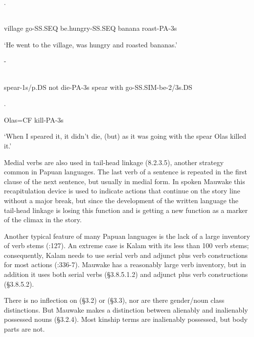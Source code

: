 \ea%
\label{ex:x662}
\gll {}. \\
      \\
\glt
\z

village  go-SS.SEQ  be.hungry-SS.SEQ  banana  roast-PA-3s  

`He went to the village, was hungry and roasted bananas.'

\ea%
\label{ex:x663}
\gll {}- \\
      \\
\glt
\z

spear-1s/p.DS  not  die-PA-3s  spear  with  go-SS.SIM-be-2/3s.DS  

.

Olas=CF  kill-PA-3s

`When I speared it, it didn't die, (but) as it was going with the spear Olas killed it.'

Medial verbs are also used in tail-head linkage (8.2.3.5), another strategy common in Papuan languages. The last verb of a sentence is repeated in the first clause of the next sentence, but usually in medial form.  In spoken Mauwake this recapitulation device is used to indicate actions that continue on the story line without a major break, but since the development of the written language the tail-head linkage is losing this function and is getting a new function as a  marker of the climax in the story.

Another typical feature of many Papuan languages is the lack of a large inventory of verb stems (:127). An extreme case is Kalam with its less than 100 verb stems; consequently, Kalam needs to use serial verb and adjunct plus verb constructions for most actions (:336-7). Mauwake has a reasonably large verb inventory, but in addition it uses both serial verbs ({\S}3.8.5.1.2) and adjunct plus verb constructions ({\S}3.8.5.2).

There is no inflection on  ({\S}3.2) or \textstyleEmphasizedWords{\textsc{} }({\S}3.3), nor are there gender/noun class distinctions. But Mauwake makes a distinction between alienably and inalienably possessed nouns ({\S}3.2.4).  Most kinship terms are inalienably possessed, but body parts are not.

